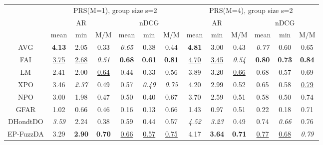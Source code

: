 \begin{tabular}{ c | c c c | c c c || c c c | c c c}

\multicolumn{1}{c}{} & \multicolumn{6}{c}{PRS(M=1), group size s=2} & \multicolumn{6}{c}{PRS(M=4), group size s=2} \\
\multicolumn{1}{c}{} & \multicolumn{3}{c}{AR} & \multicolumn{3}{c}{nDCG} & \multicolumn{3}{c}{AR} & \multicolumn{3}{c}{nDCG} \\
& mean & min & M/M & mean & min & M/M & mean & min & M/M & mean & min & M/M \\
\hline
AVG & \textbf{4.13} & 2.05 & 0.33 & \textit{0.65} & 0.38 & 0.44 & \textbf{4.81} & 3.00 & 0.43 & \textit{0.77} & 0.60 & 0.65 \\
FAI & \underline{3.75} & \underline{2.68} & \textit{0.51} & \textbf{0.68} & \textbf{0.61} & \textbf{0.81} & \underline{4.70} & \underline{3.45} & \textit{0.54} & \textbf{0.80} & \textbf{0.73} & \textbf{0.84} \\
LM & 2.41 & 2.00 & \underline{0.64} & 0.44 & 0.33 & 0.56 & 3.89 & 3.20 & \underline{0.66} & 0.68 & 0.57 & 0.69 \\
XPO & 3.46 & \textit{2.37} & 0.49 & 0.57 & \textit{0.49} & \textit{0.75} & 4.20 & 2.99 & 0.52 & 0.65 & 0.58 & \underline{0.79} \\
NPO & 3.00 & 1.98 & 0.47 & 0.50 & 0.40 & 0.67 & 3.70 & 2.59 & 0.51 & 0.58 & 0.50 & 0.74 \\
GFAR & 1.02 & 0.66 & 0.46 & 0.16 & 0.13 & 0.66 & 1.43 & 0.97 & 0.51 & 0.22 & 0.18 & 0.71 \\
DHondtDO & \textit{3.59} & 2.24 & 0.38 & 0.59 & 0.44 & 0.57 & \textit{4.52} & \textit{3.23} & 0.49 & 0.74 & \textit{0.66} & 0.76 \\
EP-FuzzDA & 3.29 & \textbf{2.90} & \textbf{0.70} & \underline{0.66} & \underline{0.57} & \underline{0.75} & 4.17 & \textbf{3.64} & \textbf{0.71} & \underline{0.77} & \underline{0.68} & \textit{0.79} \\


\end{tabular}
